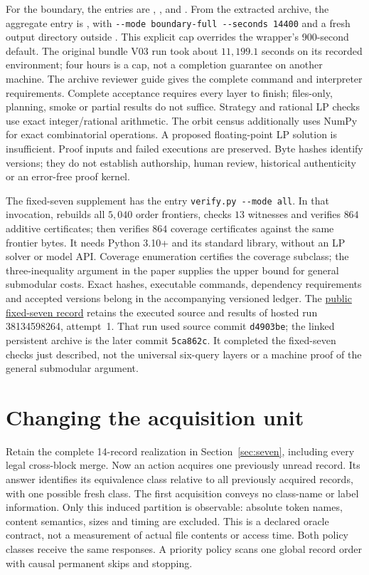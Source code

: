 \documentclass[pdflatex,sn-mathphys-num]{sn-jnl}
\theoremstyle{thmstyleone}
\theoremstyle{thmstylethree}
\theoremstyle{thmstyletwo}
\begin{document}
For the boundary, the entries are , ,  and . From the extracted archive, the aggregate entry is , with \verb|--mode boundary-full --seconds 14400| and a fresh output directory outside . This explicit cap overrides the wrapper's 900-second default. The original bundle V03 run took about $11,199.1$ seconds on its recorded environment; four hours is a cap, not a completion guarantee on another machine. The archive reviewer guide gives the complete command and interpreter requirements. Complete acceptance requires every layer to finish; files-only, planning, smoke or partial results do not suffice. Strategy and rational LP checks use exact integer/rational arithmetic. The orbit census additionally uses NumPy for exact combinatorial operations. A proposed floating-point LP solution is insufficient. Proof inputs and failed executions are preserved. Byte hashes identify versions; they do not establish authorship, human review, historical authenticity or an error-free proof kernel.

The fixed-seven supplement has the entry \verb|verify.py --mode all|. In that invocation,  rebuilds all $5,040$ order frontiers, checks $13$ witnesses and verifies $864$ additive certificates;  then verifies $864$ coverage certificates against the same frontier bytes. It needs Python 3.10+ and its standard library, without an LP solver or model API. Coverage enumeration certifies the coverage subclass; the three-inequality argument in the paper supplies the upper bound for general submodular costs. Exact hashes, executable commands, dependency requirements and accepted versions belong in the accompanying versioned ledger. The \href{https://github.com/SHiJiE1115/newproj/blob/5ca862c87d35df3db12c83e28e5167f4eebdbb09/theory/HOSTED_RUNS.md}{public fixed-seven record} retains the executed source and results of hosted run 38134598264, attempt~1. That run used source commit \texttt{d4903be}; the linked persistent archive is the later commit \texttt{5ca862c}. It completed the fixed-seven checks just described, not the universal six-query layers or a machine proof of the general submodular argument.


\section{Changing the acquisition unit}\label{app:record-acquisition}
Retain the complete 14-record realization in Section~\ref{sec:seven}, including every legal cross-block merge. Now an action acquires one previously unread record. Its answer identifies its equivalence class relative to all previously acquired records, with one possible fresh class. The first acquisition conveys no class-name or label information. Only this induced partition is observable: absolute token names, content semantics, sizes and timing are excluded. This is a declared oracle contract, not a measurement of actual file contents or access time. Both policy classes receive the same responses. A priority policy scans one global record order with causal permanent skips and stopping.
\end{document}
